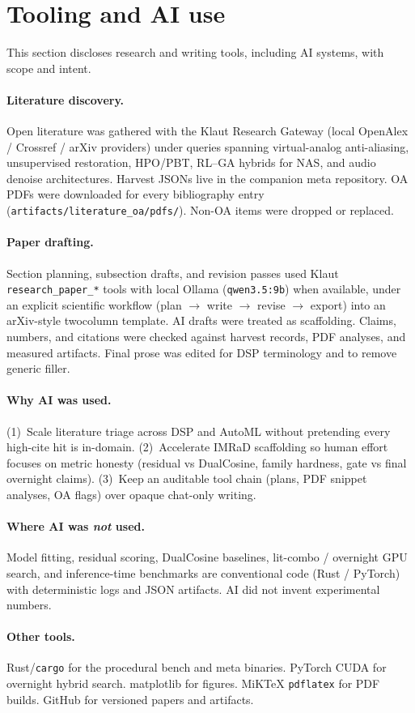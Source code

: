 \section{Tooling and AI use}
\label{sec:tooling}

This section discloses research and writing tools, including AI systems, with
scope and intent.

\paragraph{Literature discovery.}
Open literature was gathered with the Klaut Research Gateway (local OpenAlex /
Crossref / arXiv providers) under queries spanning virtual-analog anti-aliasing,
unsupervised restoration, HPO/PBT, RL--GA hybrids for NAS, and audio denoise
architectures.
Harvest JSONs live in the companion meta repository.
OA PDFs were downloaded for every bibliography entry
(\texttt{artifacts/literature\_oa/pdfs/}).
Non-OA items were dropped or replaced.

\paragraph{Paper drafting.}
Section planning, subsection drafts, and revision passes used Klaut
\texttt{research\_paper\_*} tools with local Ollama (\texttt{qwen3.5:9b}) when
available, under an explicit scientific workflow (plan $\rightarrow$ write
$\rightarrow$ revise $\rightarrow$ export) into an arXiv-style twocolumn
template.
AI drafts were treated as scaffolding. Claims, numbers, and citations
were checked against harvest records, PDF analyses, and measured artifacts.
Final prose was edited for DSP terminology and to remove generic filler.

\paragraph{Why AI was used.}
(1)~Scale literature triage across DSP and AutoML without pretending every
high-cite hit is in-domain.
(2)~Accelerate IMRaD scaffolding so human effort
focuses on metric honesty (residual vs DualCosine, family hardness, gate vs
final overnight claims).
(3)~Keep an auditable tool chain (plans, PDF
snippet analyses, OA flags) over opaque chat-only writing.

\paragraph{Where AI was \emph{not} used.}
Model fitting, residual scoring, DualCosine baselines, lit-combo / overnight
GPU search, and inference-time benchmarks are conventional code (Rust / PyTorch)
with deterministic logs and JSON artifacts.
AI did not invent experimental numbers.

\paragraph{Other tools.}
Rust/\texttt{cargo} for the procedural bench and meta binaries. PyTorch CUDA
for overnight hybrid search. matplotlib for figures. MiKTeX \texttt{pdflatex}
for PDF builds. GitHub for versioned papers and artifacts.
